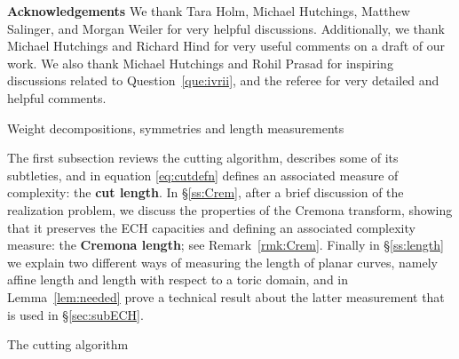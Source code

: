 \documentclass[11pt, reqno]{amsart}
\makeatletter
\def\section{\@startsection{section}{1}%
  \z@{.7\linespacing\@plus\linespacing}{.5\linespacing}%
  {\normalfont\Large\bfseries}}
\def\subsection{\@startsection{subsection}{2}%
  \z@{.75\linespacing\@plus.7\linespacing}{-.5em}%
  {\normalfont\large\bfseries}}
\theoremstyle{remark}
\numberwithin{equation}{subsection}
\numberwithin{figure}{section}
\theoremstyle{customremark}
\newcommand{\NI}{{\noindent}}
\makeatother
\begin{document}
\vspace{3 mm}

\NI {\bf Acknowledgements}
We thank Tara Holm, Michael Hutchings, Matthew Salinger, and Morgan Weiler for very helpful discussions. Additionally, we thank Michael Hutchings and Richard Hind for very useful comments on a draft of our work.  We also thank Michael Hutchings and Rohil Prasad for inspiring discussions related to Question~\ref{que:ivrii}, and the referee for very detailed and helpful comments.  

\section{Weight decompositions, symmetries and length measurements}\label{sec:weight}

The first subsection reviews the cutting algorithm, describes some of its subtleties, and in equation \eqref{eq:cutdefn}
defines an associated measure of complexity: the {\bf cut length}. In \S\ref{ss:Crem}, after a  brief discussion of the realization problem,
we discuss the properties of the Cremona transform, 
showing that it preserves  the ECH capacities and defining an associated complexity measure: the {\bf Cremona length}; see Remark~\ref{rmk:Crem}.  Finally in \S\ref{ss:length} we explain two different ways of measuring the length of planar curves, namely affine length and 
length with respect to a toric domain, and in Lemma~\ref{lem:needed} prove a technical result about the latter  measurement that is used in \S\ref{sec:subECH}.



\subsection{The cutting algorithm}\label{ss:cut}
\end{document}
